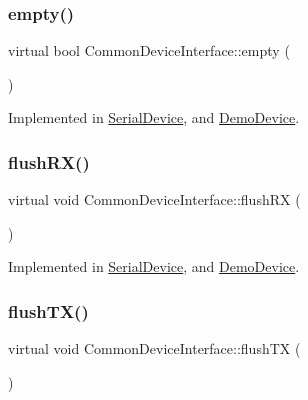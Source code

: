 \subsubsection{\texorpdfstring{empty()}{empty()}}
{\footnotesize\ttfamily virtual bool Common\+Device\+Interface\+::empty (\begin{DoxyParamCaption}{ }\end{DoxyParamCaption})\hspace{0.3cm}{\ttfamily [pure virtual]}}



Implemented in \hyperlink{class_serial_device_ae9fc540188704dbdbf3e75d482a92b86}{Serial\+Device}, and \hyperlink{class_demo_device_a52de363ec31fdbb540cf7cae6f584d22}{Demo\+Device}.

\hypertarget{class_common_device_interface_a353c3bd7d63dfa9c3fa3d8bf1f392530}{}\label{class_common_device_interface_a353c3bd7d63dfa9c3fa3d8bf1f392530} 
\subsubsection{\texorpdfstring{flush\+R\+X()}{flushRX()}}
{\footnotesize\ttfamily virtual void Common\+Device\+Interface\+::flush\+RX (\begin{DoxyParamCaption}{ }\end{DoxyParamCaption})\hspace{0.3cm}{\ttfamily [pure virtual]}}



Implemented in \hyperlink{class_serial_device_a9ba3e46cf67a9b03e1614afe4c40d78a}{Serial\+Device}, and \hyperlink{class_demo_device_abd7460c71a01d986b1f77908ccb779a2}{Demo\+Device}.

\hypertarget{class_common_device_interface_a45edc68596f002f0765740ee14b39b77}{}\label{class_common_device_interface_a45edc68596f002f0765740ee14b39b77} 
\subsubsection{\texorpdfstring{flush\+T\+X()}{flushTX()}}
{\footnotesize\ttfamily virtual void Common\+Device\+Interface\+::flush\+TX (\begin{DoxyParamCaption}{ }\end{DoxyParamCaption})\hspace{0.3cm}{\ttfamily [pure virtual]}}



